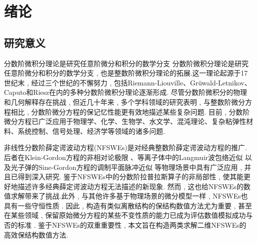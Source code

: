 \chapter[绪论]{绪论}

\section{研究意义}
分数阶微积分理论是研究任意阶微分和积分的数学分支
分数阶微积分理论是研究任意阶微分和积分的数学分支 , 也是整数阶微积分理论的拓展.这一理论起源于17世纪末 , 经过三个世纪的不懈努力 , 包括Riemann-Liouville、Grüwald-Letnikov、Caputo和Riesz在内的多种分数阶微积分理论逐渐形成\cite{samkoFractionalIntegralsDerivatives1993}.
尽管分数阶微积分的物理和几何解释存在挑战 , 但近几十年来 , 多个学科领域的研究表明 , 与整数阶微分方程相比 , 分数阶微分方程的保记忆性能更有效地描述某些复杂问题.
目前 , 分数阶微分方程已广泛应用于物理学、化学、生物学、水文学、混沌理论、复杂粘弹性材料、系统控制、信号处理、经济学等领域的诸多问题\cite{liIntroductionFractionalCalculus2015,HandbookDifferentialEquations2008,brychkovIndefiniteIntegrals2008,zhangMassBalanceBased2005,carrerasAnomalousDiffusionExit2001,maginSolvingFractionalOrder2009,zaslavskySelfsimilarTransportIncomplete1993,sunRandomorderFractionalDifferential2011}.%

非线性分数阶薛定谔波动方程(NFSWEs)是对经典整数阶薛定谔波动方程的推广.
后者在Klein-Gordon方程的非相对论极限 \cite{tsutsumiNonrelativisticApproximationNonlinear1984,machiharaNonrelativisticLimitEnergy2002}、等离子体中的Langmuir波包络近似 \cite{colinSemidiscretizationTimeNonlinear1998}
以及光子弹的Sine-Gordon方程的调制平面脉冲近似 \cite{baoComparisonsSineGordonPerturbed2010,xinModelingLightBullets2000}等物理场景中具有广泛应用 , 并且已得到深入研究\cite{zhangConservativeNumericalScheme2003,baoUniformErrorEstimates2012,chengSeveralConservativeCompact2018,brugnanoClassEnergyconservingHamiltonian2018}.
鉴于NFSWEs中的分数阶拉普拉斯算子的非局部性 , 使其能更好地描述许多经典薛定谔波动方程无法描述的新现象.
然而 , 这也给NFSWEs的数值求解带来了挑战.此外 , 与其他许多基于物理场景的微分模型一样 , NFSWEs也具有一些守恒性质 . 
因此 , 构造有类似离散结构的保结构数值方法尤为重要 , 甚至在某些领域 , 保留原始微分方程的某些不变性质的能力已成为评估数值模拟成功与否的标准 \cite{liFiniteDifferenceCalculus1995,fengHamilton1991}.
鉴于NFSWEs的双重重要性 , 本文旨在构造两类求解二维NFSWEs的高效保结构数值方法.

